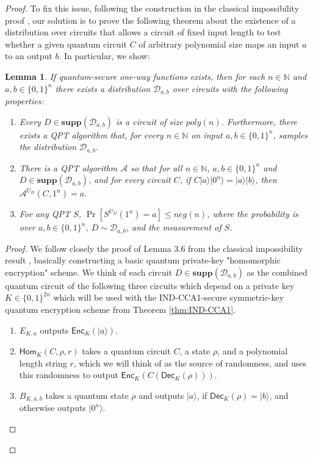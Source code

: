 \documentclass[11pt]{article}
\numberwithin{equation}{section}
\newtheorem{lemma}[theorem]{Lemma}
\newcommand{\algo}{\mathcal}
\newcommand{\Enc}{\ensuremath{\mathsf{Enc}}\xspace}
\newcommand{\Dec}{\ensuremath{\mathsf{Dec}}\xspace}
\newcommand{\Homorcl}{\ensuremath{\mathsf{Hom}}\xspace}
\newcommand\supp{\textbf{supp}}
\begin{document}
{\begin{proof}
To fix this issue, following the construction in the classical impossibility proof \cite{BGIRSVY12}, our solution is to prove the following theorem about the existence of a distribution over circuits that allows a circuit of fixed input length to test whether a given quantum circuit $C$ of arbitrary polynomial size maps an input $a$ to an output $b$. In particular, we show:
\begin{lemma}\label{lemma-circuitdistribution}
	If quantum-secure one-way functions exists, then for each $n\in\mathbb{N}$ and $a,b\in\{0,1\}^n$ there exists a distribution $\mathcal{D}_{a,b}$ over circuits with the following properties:
\begin{enumerate}
\item{Every $D\in \supp(\mathcal{D}_{a,b})$ is a circuit of size $poly(n)$.  Furthermore, there exists a QPT algorithm that,  for every $n\in\mathbb{N}$ on input $a,b\in\{0,1\}^n$, samples the distribution $\mathcal{D}_{a,b}$.}
\item{There is a QPT algorithm $\algo{A}$ so that for all $n \in \mathbb{N}$,   $a,b\in\{0,1\}^n$ and $D\in \supp(\mathcal{D}_{a,b})$, and for every circuit $C$, if $C|a\rangle|0^n\rangle=|a\rangle|b\rangle$, then $\algo{A}^{U_D}(C,1^n)=a$.}
\item{For any QPT $S$, $\Pr[S^{U_D}(1^n)=a]\leq neg(n)$, where the probability is over $a,b\in\{0,1\}^n$, $D\sim \mathcal{D}_{a,b}$, and the measurement of $S$.}	
\end{enumerate}
\end{lemma}

\begin{proof}  We follow closely the proof of Lemma 3.6 from the classical impossibility result \cite{BGIRSVY12}, basically constructing a basic quantum private-key "homomorphic encryption" scheme.  We think of each circuit $D\in \supp(\mathcal{D}_{a,b})$ as the combined quantum circuit of the following three circuits which depend on a private key $K\in\{0,1\}^{2n}$ which will be used with the IND-CCA1-secure symmetric-key quantum encryption scheme from Theorem \ref{thm:IND-CCA1}.
\begin{enumerate}
\item{$E_{K,a}$ outputs  $\Enc_{K}(|a\rangle)$}.  
\item{$\Homorcl_K(C,\rho,r)$ takes a quantum circuit $C$, a state $\rho$, and a polynomial length string $r$, which we will think of as the source of randomness, and uses this randomness to output $\Enc_K(C(\Dec_K(\rho)))$}.
\item{$B_{K,a,b}$ takes a quantum state $\rho$ and outputs $|a\rangle$, if $\Dec_{K}(\rho)=|b\rangle$, and otherwise outputs $|0^n\rangle$.}	
\end{enumerate}


\end{proof}
\end{proof}}
\end{document}
